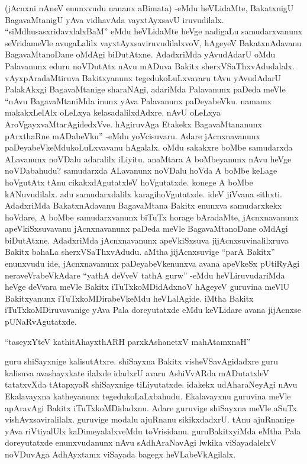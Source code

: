(jAcnxni nAneV enunxvudu nananx aBimata) -eMdu heVLidaMte, BakatxnigU BagavaMtanigU yAva vidhavAda vayxtAyxsavU iruvudilalx. ``siMdhusasxridavxlalxBaM'' eMdu heVLidaMte heVge nadigaLu samudarxvanunx seVridameVle avugaLalilx vayxtAyxsaviruvudilalxvoV, hAgeyeV BakatxnAdavanu BagavaMtanoDane oMdAgi biDutAtxne. AdadxriMda yAvudAdarU oMdu Palavanunx eduru noVDutAtx nAvu mADuva Bakitx sherxVSaThxvAdudalalx. vAyxpAradaMtiruva Bakitxyanunx tegedukoLuLxvavaru tAvu yAvudAdarU PalakAkxgi BagavaMtanige sharaNAgi, adariMda Palavanunx paDeda meVle ``nAvu BagavaMtaniMda inunx yAva Palavanunx paDeyabeVku. namamx makakxLelAlx oLeLxya kelasadalilxdAdxre. nAvU oLeLxya AroVgayxvaMtarAgidedxVve. hAgiruvAga Etakekx BagavaMtananunx pArxthaRne mADabeVku'' -eMdu yoVcisuvaru. Adare jAcnxnavanunx paDeyabeVkeMdukoLuLxvavanu hAgalalx. oMdu sakakxre boMbe samudarxda ALavanunx noVDalu adaralilx iLiyitu. anaMtara A boMbeyanunx nAvu heVge noVDabahudu? samudarxda ALavanunx noVDalu hoVda A boMbe keLage hoVgutAtx tAnu cikakxdAgutatxleV hoVgutatxde. konege A boMbe kANuvudilalx. adu samudarxdalilx karagihoVgutatxde. ideV jiVvana sithxti. AdadxriMda BakatxnAdavanu BagavaMtana Bakitx enunxva samudarxkekx hoVdare, A boMbe samudarxvanunx biTuTx horage bAradaMte, jAcnxnavanunx apeVkiSxsuvavanu jAcnxnavanunx paDeda meVle BagavaMtanoDane oMdAgi biDutAtxne. AdadxriMda jAcnxnavanunx apeVkiSxsuva jijAcnxsuvinalilxruva Bakitx bahaLa sherxVSaThxvAdudu. aMtha jijAcnxsuvige ``parA Bakitx'' enunxvudu ide, jAcnxnavanunx paDeyabeVkenunxva avana apeVkeSx pUtiRyAgi neraveVrabeVkAdare ``yathA deVveV tathA gurw'' -eMdu heVLiruvudariMda heVge deVvara meVle Bakitx iTuTxkoMDidAdxnoV hAgeyeV guruvina meVlU Bakitxyanunx iTuTxkoMDirabeVkeMdu heVLalAgide. iMtha Bakitx iTuTxkoMDiruvavanige yAva Pala doreyutatxde eMdu keVLidare avana jijAcnxse pUNaRvAgutatxde.

\begin{shloka}
``taseyxYteV kathitAhayxthARH parxkAshanetxV mahAtamxnaH''
\end{shloka}

guru shiSayxnige kalisutAtxre. shiSayxna Bakitx visheVSavAgidadxre guru kalisuva avashayxkate ilalxde idadxrU avaru AshiVvARda mADutatxleV tatatxvXda tAtapxyaR shiSayxnige tiLiyutatxde. idakekx udAharaNeyAgi nAvu Ekalavayxna katheyanunx tegedukoLaLxbahudu. Ekalavayxnu guruvina meVle apAravAgi Bakitx iTuTxkoMDidadxnu. Adare guruvige shiSayxna meVle aSuTx vishAvxsaviralilalx. guruvige modalu ajuRnanu sikikxdadxrU. tAnu ajuRnanige yAva riVtiyalUlx kaDimeyalalxveMdu toVrisidanu. guruBakitxyiMda eMtha Pala doreyutatxde enunxvudanunx nAvu sAdhAraNavAgi lwkika viSayadalelxV noVDuvAga AdhAyxtamx viSayada bagegx heVLabeVkAgilalx.


